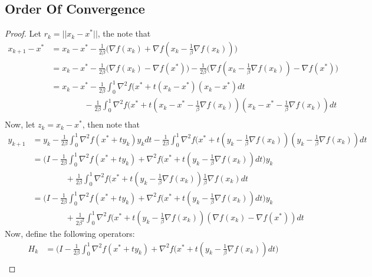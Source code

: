\subsection{Order Of Convergence}
\begin{proof}
Let $r_k = || x_k - x^* ||$, the note that
\begin{equation}
\begin{aligned}
x_{k+1} - x^* &= x_{k} - x^* - \frac{1}{2\beta} \big( \nabla f(x_k) + \nabla f(x_k - \frac{1}{\beta} \nabla f(x_k))  \big)\\
 &= x_{k} - x^* - \frac{1}{2\beta} \big( \nabla f(x_k) - \nabla f(x^*) \big) - \frac{1}{2\beta} \big( \nabla f(x_k - \frac{1}{\beta} \nabla f(x_k)) - \nabla f(x^*) \big) \\
 &= x_{k} - x^* - \frac{1}{2\beta} \int_0^1 \nabla^2 f(x^* + t(x_k - x^*)(x_k - x^*)dt \\
& \quad \quad \quad \quad - \frac{1}{2\beta} \int_0^1 \nabla^2 f(x^* + t(x_k - x^* - \frac{1}{\beta} \nabla f(x_k) )(x_k - x^* - \frac{1}{\beta} \nabla f(x_k))dt \\
\end{aligned}
\end{equation}
Now, let $z_k = x_k - x^*$, then note that
\begin{equation}
\begin{aligned}
y_{k+1} &= y_k - \frac{1}{2\beta} \int_0^1 \nabla^2 f(x^* + ty_k)y_kdt - \frac{1}{2\beta} \int_0^1 \nabla^2 f(x^* + t(y_k - \frac{1}{\beta} \nabla f(x_k))(y_k - \frac{1}{\beta} \nabla f(x_k))dt \\
&= \big(I -  \frac{1}{2\beta} \int_0^1 \nabla^2 f(x^* + ty_k) + \nabla^2 f(x^* + t(y_k - \frac{1}{\beta} \nabla f(x_k)) dt  \big) y_k \\
& \quad \quad \quad \quad  + \frac{1}{2\beta} \int_0^1 \nabla^2 f(x^* + t(y_k - \frac{1}{\beta} \nabla f(x_k)) \frac{1}{\beta} \nabla f(x_k) dt \\
&= \big(I -  \frac{1}{2\beta} \int_0^1 \nabla^2 f(x^* + ty_k) + \nabla^2 f(x^* + t(y_k - \frac{1}{\beta} \nabla f(x_k)) dt  \big) y_k \\
& \quad \quad \quad \quad  + \frac{1}{2\beta^2} \int_0^1 \nabla^2 f(x^* + t(y_k - \frac{1}{\beta} \nabla f(x_k)) ( \nabla f(x_k)  - \nabla f(x^*) )dt
\end{aligned}
\end{equation}
Now, define the following operators:
\begin{equation}
\begin{aligned}
H_k &=  \big(I -  \frac{1}{2\beta} \int_0^1 \nabla^2 f(x^* + ty_k) + \nabla^2 f(x^* + t(y_k - \frac{1}{\beta} \nabla f(x_k)) dt  \big) \\

\end{aligned}
\end{equation}
\end{proof}
